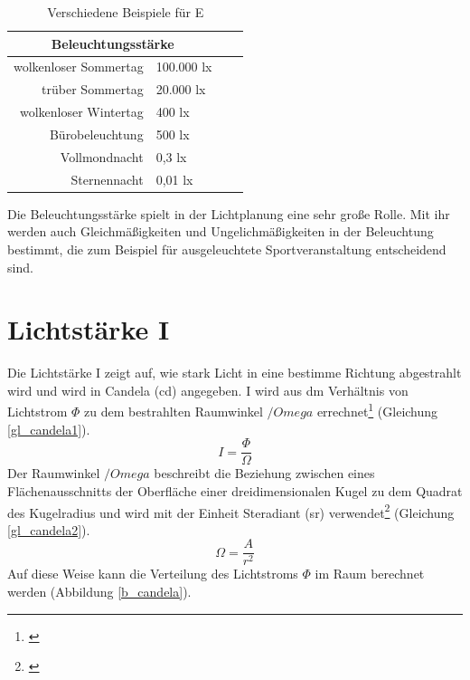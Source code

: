 \begin{table}[htp] 
		\centering
		\begin{tabular}{rlcc}  %
		\toprule
		\multicolumn{2}{c}{\large\sffamily Beleuchtungsstärke}\\ 							
		\midrule
		wolkenloser Sommertag & 100.000 lx\\
		trüber Sommertag & 20.000 lx\\
		wolkenloser Wintertag & 400 lx\\
		Bürobeleuchtung & 500 lx\\
		Vollmondnacht & 0,3 lx\\
		Sternennacht & 0,01 lx\\
		\bottomrule
		\end{tabular}
		\caption{Verschiedene Beispiele für E\protect\footnotemark}	
		\label{t_lux}
	\end{table}
Die Beleuchtungsstärke spielt in der Lichtplanung eine sehr große Rolle. Mit ihr werden auch Gleichmäßigkeiten und Ungelichmäßigkeiten in der Beleuchtung bestimmt, die zum Beispiel für ausgeleuchtete Sportveranstaltung entscheidend sind.

\section{Lichtstärke I}\label{sec_candela}
Die Lichtstärke I zeigt auf, wie stark Licht in eine bestimme Richtung abgestrahlt wird und wird in Candela (cd) angegeben. I wird aus dm Verhältnis von Lichtstrom $\Phi$ zu dem bestrahlten Raumwinkel $/Omega$ errechnet\footnote{\cite[27]{ris}} (Gleichung \ref{gl_candela1}).
 \begin{equation}\label{gl_candela1}
	I=\frac{\Phi}{\Omega}	
\end{equation}
Der Raumwinkel $/Omega$ beschreibt die Beziehung zwischen eines Flächenausschnitts der Oberfläche einer dreidimensionalen Kugel zu dem Quadrat des Kugelradius und wird mit der Einheit Steradiant (sr) verwendet\footnote{\cite[26]{ris}}  (Gleichung \ref{gl_candela2}).
 \begin{equation}\label{gl_candela2}
	\Omega=\frac{A}{r^{2}}	
\end{equation}
Auf diese Weise kann die Verteilung des Lichtstroms $\Phi$ im Raum berechnet werden (Abbildung \ref{b_candela}).

